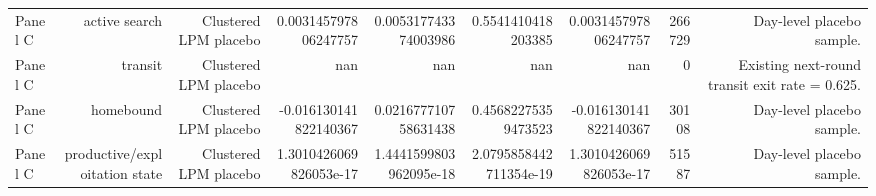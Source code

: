 \documentclass{article}
\begin{document}
\begin{tabular}{lrrrrrrrr}
Panel C & active search & Clustered LPM placebo & 0.003145797806247757 & 0.005317743374003986 & 0.5541410418203385 & 0.003145797806247757 & 266729 & Day-level placebo sample. \\
Panel C & transit & Clustered LPM placebo & nan & nan & nan & nan & 0 & Existing next-round transit exit rate = 0.625. \\
Panel C & homebound & Clustered LPM placebo & -0.016130141822140367 & 0.021677710758631438 & 0.45682275359473523 & -0.016130141822140367 & 30108 & Day-level placebo sample. \\
Panel C & productive/exploitation state & Clustered LPM placebo & 1.3010426069826053e-17 & 1.4441599803962095e-18 & 2.0795858442711354e-19 & 1.3010426069826053e-17 & 51587 & Day-level placebo sample. \\
\hline
\end{tabular}
\end{document}
